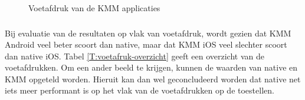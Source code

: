 \begin{figure}
    \qquad
    \caption{Voetafdruk van de KMM applicaties}
    \label{fig:M-voetafdruk-kmm}%
\end{figure}

\subsubsection{}
\label{sec:M-test-voetafdruk-conclusie}
Bij evaluatie van de resultaten op vlak van voetafdruk, wordt gezien dat KMM Android veel beter scoort dan native, maar dat KMM iOS veel slechter scoort dan native iOS. Tabel \ref{T:voetafruk-overzicht} geeft een overzicht van de voetafdrukken. Om een ander beeld te krijgen, kunnen de waarden van native en KMM opgeteld worden. Hieruit kan dan wel geconcludeerd worden dat native net iets meer performant is op het vlak van de voetafdrukken op de toestellen.

